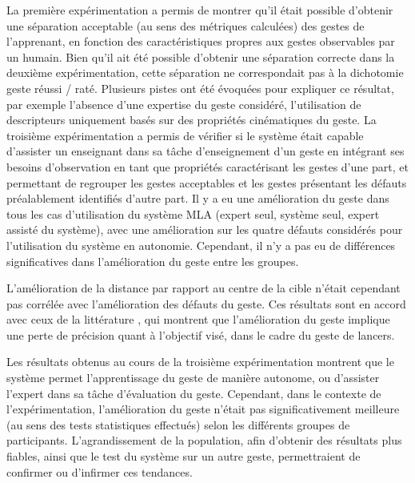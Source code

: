 La première expérimentation a permis de montrer qu'il était possible d'obtenir une séparation acceptable (au sens des métriques calculées) des gestes de l'apprenant, en fonction des caractéristiques propres aux gestes observables par un humain. Bien qu'il ait été possible d'obtenir une séparation correcte dans la deuxième expérimentation, cette séparation ne correspondait pas à la dichotomie geste réussi / raté. Plusieurs pistes ont été évoquées pour expliquer ce résultat, par exemple l'absence d'une expertise du geste considéré, l'utilisation de descripteurs uniquement basés sur des propriétés cinématiques du geste. La troisième expérimentation a permis de vérifier si le système était capable d'assister un enseignant dans sa tâche d'enseignement d'un geste en intégrant ses besoins d'observation en tant que propriétés caractérisant les gestes d'une part, et permettant de regrouper les gestes acceptables et les gestes présentant les défauts préalablement identifiés d'autre part. Il y a eu une amélioration du geste dans tous les cas d'utilisation du système MLA (expert seul, système seul, expert assisté du système), avec une amélioration sur les quatre défauts considérés pour l'utilisation du système en autonomie. Cependant, il n'y a pas eu de différences significatives dans l'amélioration du geste entre les groupes.

L'amélioration de la distance par rapport au centre de la cible n'était cependant pas corrélée avec l'amélioration des défauts du geste. Ces résultats sont en accord avec ceux de la littérature \parencite{LeNaour2019S3V, Ashford2006OME}, qui montrent que l'amélioration du geste implique une perte de précision quant à l'objectif visé, dans le cadre du geste de lancers.

Les résultats obtenus au cours de la troisième expérimentation montrent que le système permet l'apprentissage du geste de manière autonome, ou d'assister l'expert dans sa tâche d'évaluation du geste. Cependant, dans le contexte de l'expérimentation, l'amélioration du geste n'était pas significativement meilleure (au sens des tests statistiques effectués) selon les différents groupes de participants. L'agrandissement de la population, afin d'obtenir des résultats plus fiables, ainsi que le test du système sur un autre geste, permettraient de confirmer ou d'infirmer ces tendances.


